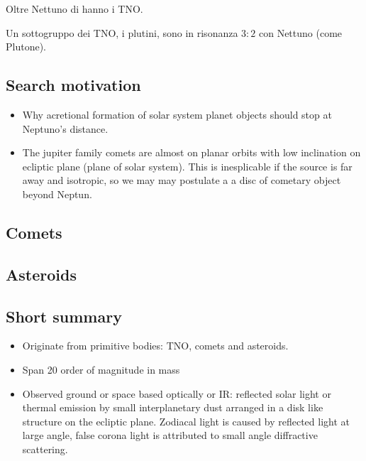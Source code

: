 Oltre Nettuno di hanno i TNO.

Un sottogruppo dei TNO, i plutini, sono in risonanza $3:2$ con Nettuno (come Plutone).

\subsection{Search motivation}

\begin{itemize}
\item Why acretional formation of solar system planet objects should stop at Neptuno's distance.
\item The jupiter family comets are almost on planar orbits with low inclination on ecliptic plane (plane of solar system). This is inesplicable if the source is far away and isotropic, so we may may postulate a a disc of cometary object beyond Neptun.
\end{itemize}

\subsection{Comets}

\subsection{Asteroids}

\subsection{Short summary}
\begin{itemize}
\item Originate from primitive bodies: TNO, comets and asteroids.
\item Span 20 order of magnitude in mass
\item Observed ground or space based optically or IR: reflected solar light or thermal emission by small interplanetary dust arranged in a disk like structure on the ecliptic plane.
Zodiacal light is caused by reflected light at large angle, false corona light is attributed to small angle diffractive scattering.
\end{itemize}


